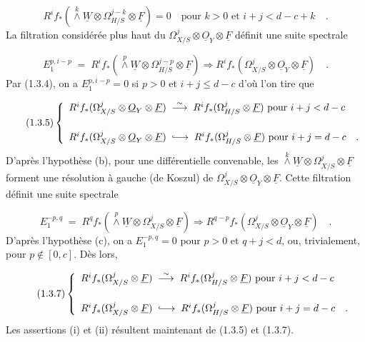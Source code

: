 \begin{equation}\tag{1.3.4}
R^i f_* ( \stackrel{k}{\wedge}\underline{W} \otimes \Omega^{j-k}_{H/S} \otimes \underline{F}) = 0 \quad \mbox{pour } k > 0 \mbox{ et } i+j < d-c+k \quad .
\end{equation}
La filtration considérée plus haut du $\Omega^j_{X/S} \otimes \underline{O}_Y \otimes \underline{F}$ définit une suite spectrale

\begin{equation*}
E_1^{p,i-p} \; = \; R^i f_*( \stackrel{p}{\wedge} \underline{W} \otimes \Omega^{j-p}_{H/S} \otimes \underline{F}) \Longrightarrow R^i f_*(\Omega^j_{X/S} \otimes \underline{O}_Y \otimes \underline{F}) \quad .
\end{equation*}
Par (1.3.4), on a $E_1^{p,i-p} = 0$ si $p > 0$ et $i+j \leq d-c$ d'où l'on tire que

\begin{equation}\tag{1.3.5}
\left\{ \begin{array}{l} R^i f_*(\Omega^j_{X/S} \otimes \underline{O}_Y \otimes \underline{F}) \; \stackrel{\sim}{\longrightarrow} \; R^i f_*(\Omega^j_{H/S} \otimes \underline{F}) \mbox{ pour } i+j < d-c \\[4ex] R^i f_*(\Omega^j_{X/S} \otimes \underline{O}_Y \otimes \underline{F}) \; \lhook\joinrel\longrightarrow \; R^i f_*(\Omega^j_{H/S} \otimes \underline{F}) \mbox{ pour } i+j = d-c \quad . \end{array} \right.
\end{equation}
D'après l'hypothèse (b), pour une différentielle convenable, les $\stackrel{k}{\wedge} \underline{W} \otimes \Omega^j_{X/S} \otimes \underline{F}$ forment une résolution à gauche (de Koszul) de $\Omega^j_{X/S} \otimes \underline{O}_Y \otimes \underline{F}$. Cette filtration définit une suite spectrale

\begin{equation}\tag{1.3.6}
E_1^{-p,q} \; = \; R^q f_*( \stackrel{p}{\wedge}\underline{W} \otimes \Omega^j_{X/S} \otimes \underline{F}) \Longrightarrow R^{q-p} f_*(\Omega^j_{X/S} \otimes \underline{O}_Y \otimes \underline{F}) \quad .
\end{equation}
D'après l'hypothèse (c), on a $E_1^{-p,q} = 0$ pour $p > 0$ et $q+j < d$, ou, trivialement, pour $p \notin [0,c]$. Dès lors,

\begin{equation}\tag{1.3.7}
\left\{ \begin{array}{l} R^i f_*(\Omega^j_{X/S} \otimes \underline{F}) \; \stackrel{\sim}{\longrightarrow} \; R^i f_*(\Omega^j_{H/S} \otimes \underline{F}) \mbox{ pour } i+j < d-c \\[4ex] R^i f_*(\Omega^j_{X/S} \otimes \underline{F}) \; \lhook\joinrel\longrightarrow \; R^i f_*(\Omega^j_{H/S} \otimes \underline{F}) \mbox{ pour } i+j = d-c \quad . \end{array} \right.
\end{equation}
Les assertions (i) et (ii) résultent maintenant de (1.3.5) et (1.3.7).


